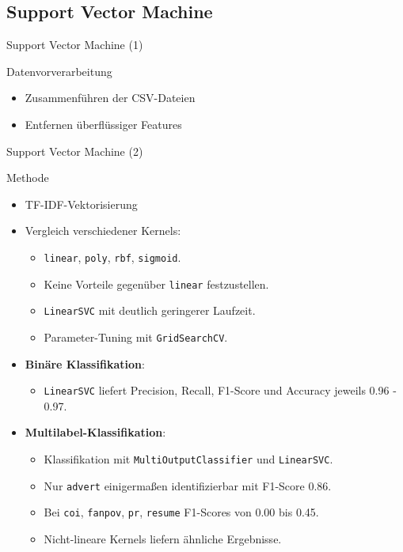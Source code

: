 \documentclass[aspectratio=169]{beamer} %
\begin{document}
\subsection{Support Vector Machine}

\begin{frame}{Support Vector Machine (1)}
    \begin{block}{Datenvorverarbeitung}
        \begin{itemize}
            \item Zusammenf\"uhren der CSV-Dateien
            \item Entfernen \"uberfl\"ussiger Features
        \end{itemize}
    \end{block}
\end{frame}

\begin{frame}{Support Vector Machine (2)}
    \begin{block}{Methode}
        \begin{itemize}
            \item TF-IDF-Vektorisierung
            \item Vergleich verschiedener Kernels:
                \begin{itemize}
                    \item \texttt{linear}, \texttt{poly}, \texttt{rbf}, \texttt{sigmoid}.
                    \item Keine Vorteile gegen\"uber \texttt{linear} festzustellen.
                    \item \texttt{LinearSVC} mit deutlich geringerer Laufzeit.
                    \item Parameter-Tuning mit \texttt{GridSearchCV}.
                \end{itemize}
            \item \textbf{Bin\"are Klassifikation}:
                \begin{itemize}
                    \item \texttt{LinearSVC} liefert Precision, Recall, F1-Score und Accuracy jeweils 0.96 - 0.97.
                \end{itemize}
            \item \textbf{Multilabel-Klassifikation}:
                \begin{itemize}
                    \item Klassifikation mit \texttt{MultiOutputClassifier} und \texttt{LinearSVC}.
                    \item Nur \texttt{advert} einigerma\ss{}en identifizierbar mit F1-Score 0.86.
                    \item Bei \texttt{coi}, \texttt{fanpov}, \texttt{pr}, \texttt{resume} F1-Scores von 0.00 bis 0.45.
                    \item Nicht-lineare Kernels liefern \"ahnliche Ergebnisse.
                \end{itemize}
        \end{itemize}
    \end{block}
\end{frame}
\end{document}
